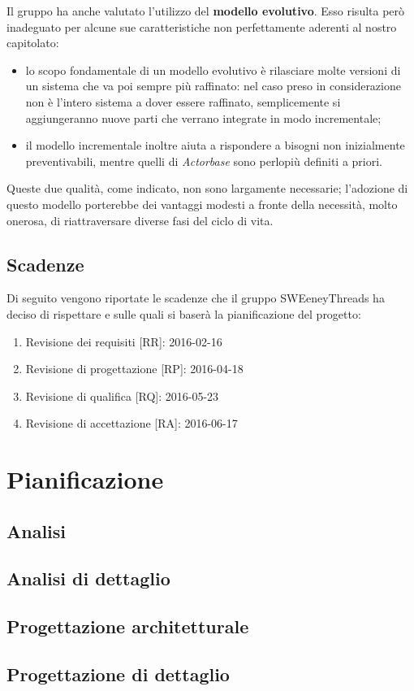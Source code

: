 \documentclass[a4paper]{report}
\newcommand{\mychapter}[2]{
	\setcounter{chapter}{#1}
	\setcounter{section}{0}
	\setcounter{subsection}{1}
	\chapter*{#2}
	\addcontentsline{toc}{chapter}{#2}
}
\begin{document}
			Il gruppo ha anche valutato l'utilizzo del \textbf{modello evolutivo}. Esso risulta però inadeguato per alcune sue 
			caratteristiche non perfettamente aderenti al nostro capitolato:
			\begin{itemize}
				\item lo scopo fondamentale di un modello evolutivo è rilasciare molte versioni di un sistema che va 
				poi sempre più raffinato: nel caso preso in considerazione non è l'intero sistema a dover essere raffinato, 
				semplicemente si aggiungeranno nuove parti che verrano integrate in modo incrementale;
				\item il modello incrementale inoltre aiuta a rispondere a bisogni non inizialmente preventivabili, mentre 
				quelli di \emph{Actorbase} sono perlopiù definiti a priori.
			\end{itemize}
			Queste due qualità, come indicato, non sono largamente necessarie; l'adozione di questo modello porterebbe dei 
			vantaggi modesti a fronte della necessità, molto onerosa, di riattraversare diverse fasi del ciclo di vita.
		\section{Scadenze}
			Di seguito vengono riportate le scadenze che il gruppo SWEeneyThreads ha deciso di rispettare e sulle quali 
			si baserà la pianificazione del progetto:
			\begin{enumerate}
				\item Revisione dei requisiti [RR]: 2016-02-16
				\item Revisione di progettazione [RP]: 2016-04-18
				\item Revisione di qualifica [RQ]: 2016-05-23
				\item Revisione di accettazione [RA]: 2016-06-17
			\end{enumerate}
	\mychapter{2}{Pianificazione}
		\section{Analisi}
		\section{Analisi di dettaglio}
		\section{Progettazione architetturale}
		\section{Progettazione di dettaglio}
\end{document}
